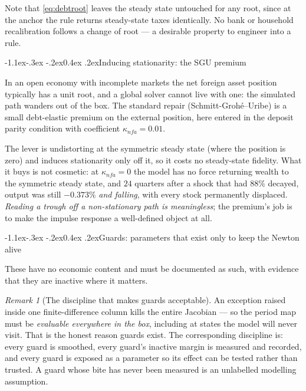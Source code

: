 \documentclass[10pt,a4paper]{article}
\makeatletter
\theoremstyle{definition}
\theoremstyle{plain}
\theoremstyle{remark}
\newtheorem{rem}[defn]{Remark}
\renewcommand\subsection{\@startsection{subsection}{2}{\z@}%
  {-1.1ex\@plus -.3ex \@minus -.2ex}{0.4ex \@plus .2ex}{\normalfont\normalsize\bfseries}}
\makeatother
\begin{document}
Note that \eqref{eq:debtroot} leaves the steady state untouched for any root, since at the
anchor the rule returns steady-state taxes identically. No bank or household recalibration
follows a change of root --- a desirable property to engineer into a rule.

\subsection{Inducing stationarity: the SGU premium}

In an open economy with incomplete markets the net foreign asset position typically has a unit
root, and a global solver cannot live with one: the simulated path wanders out of the box. The
standard repair (Schmitt-Grohé--Uribe) is a small debt-elastic premium on the external
position, here entered in the deposit parity condition with coefficient $\kappa_{nfa}=0.01$.

The lever is undistorting at the symmetric steady state (where the position is zero) and
induces stationarity only off it, so it costs no steady-state fidelity. What it buys is not
cosmetic: at $\kappa_{nfa}=0$ the model has no force returning wealth to the symmetric steady
state, and $24$ quarters after a shock that had $88\%$ decayed, output was still $-0.373\%$
\emph{and falling}, with every stock permanently displaced. \emph{Reading a trough off a
non-stationary path is meaningless}; the premium's job is to make the impulse response a
well-defined object at all.

\subsection{Guards: parameters that exist only to keep the Newton alive}

These have no economic content and must be documented as such, with evidence that they are
inactive where it matters.

\begin{rem}[The discipline that makes guards acceptable]
An exception raised inside one finite-difference column kills the entire Jacobian --- so the
period map must be \emph{evaluable everywhere in the box}, including at states the model will
never visit. That is the honest reason guards exist. The corresponding discipline is: every
guard is smoothed, every guard's inactive margin is measured and recorded, and every guard is
exposed as a parameter so its effect can be tested rather than trusted. A guard whose
bite has never been measured is an unlabelled modelling assumption.
\end{rem}
\end{document}
